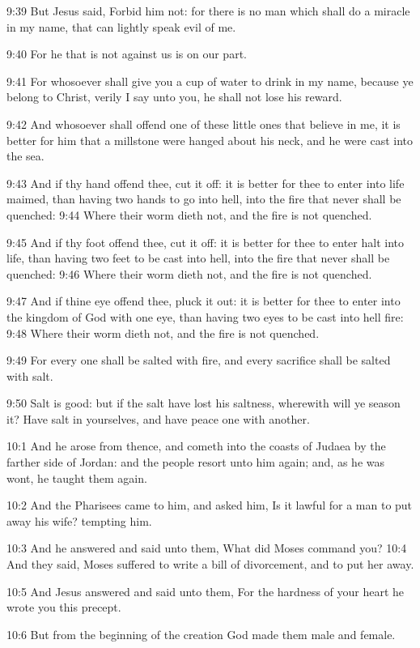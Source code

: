 9:39 But Jesus said, Forbid him not: for there is no man which shall do a miracle in my name, that can lightly speak evil of me.

9:40 For he that is not against us is on our part.

9:41 For whosoever shall give you a cup of water to drink in my name, because ye belong to Christ, verily I say unto you, he shall not lose his reward.

9:42 And whosoever shall offend one of these little ones that believe in me, it is better for him that a millstone were hanged about his neck, and he were cast into the sea.

9:43 And if thy hand offend thee, cut it off: it is better for thee to enter into life maimed, than having two hands to go into hell, into the fire that never shall be quenched: 9:44 Where their worm dieth not, and the fire is not quenched.

9:45 And if thy foot offend thee, cut it off: it is better for thee to enter halt into life, than having two feet to be cast into hell, into the fire that never shall be quenched: 9:46 Where their worm dieth not, and the fire is not quenched.

9:47 And if thine eye offend thee, pluck it out: it is better for thee to enter into the kingdom of God with one eye, than having two eyes to be cast into hell fire: 9:48 Where their worm dieth not, and the fire is not quenched.

9:49 For every one shall be salted with fire, and every sacrifice shall be salted with salt.

9:50 Salt is good: but if the salt have lost his saltness, wherewith will ye season it? Have salt in yourselves, and have peace one with another.

10:1 And he arose from thence, and cometh into the coasts of Judaea by the farther side of Jordan: and the people resort unto him again; and, as he was wont, he taught them again.

10:2 And the Pharisees came to him, and asked him, Is it lawful for a man to put away his wife? tempting him.

10:3 And he answered and said unto them, What did Moses command you?  10:4 And they said, Moses suffered to write a bill of divorcement, and to put her away.

10:5 And Jesus answered and said unto them, For the hardness of your heart he wrote you this precept.

10:6 But from the beginning of the creation God made them male and female.


